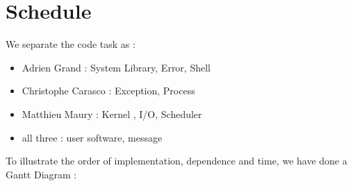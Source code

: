 \chapter{Schedule}

We separate the code task as :
\begin{itemize}
  \item Adrien Grand : System Library, Error, Shell
  \item Christophe Carasco : Exception, Process
  \item Matthieu Maury : Kernel , I/O, Scheduler
  \item all three : user software, message
\end{itemize}

To illustrate the order of implementation, dependence and time, we have done a Gantt Diagram :

\begin{figure}[h]
  \begin{center}
  \end{center}
\end{figure}
\begin{figure}[h]
  \begin{center}
  \end{center}
\end{figure}
